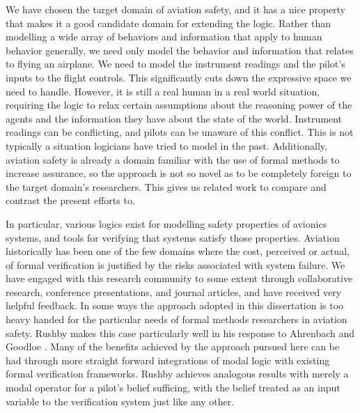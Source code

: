 We have chosen the target domain of aviation safety, and it has a nice property that makes it a good candidate domain for extending the logic. Rather than modelling a wide array of behaviors and information that apply to human behavior generally, we need only model the behavior and information that relates to flying an airplane. We need to model the instrument readings and the pilot's inputs to the flight controls. This significantly cuts down the expressive space we need to handle. However, it is still a real human in a real world situation, requiring the logic to relax certain assumptions about the reasoning power of the agents and the information they have about the state of the world. Instrument readings can be conflicting, and pilots can be unaware of this conflict. This is not typically a situation logicians have tried to model in the past. Additionally, aviation safety is already a domain familiar with the use of formal methods to increase assurance, so the approach is not so novel as to be completely foreign to the target domain's researchers. This gives us related work to compare and contrast the present efforts to.

In particular, various logics exist for modelling safety properties of avionics systems, and tools for verifying that systems satisfy those properties. Aviation historically has been one of the few domains where the cost, perceived or actual, of formal verification is justified by the risks associated with system failure. We have engaged with this research community to some extent through collaborative research, conference presentations, and journal articles, and have received very helpful feedback. In some ways the approach adopted in this dissertation is too heavy handed for the particular needs of formal methods researchers in aviation safety. Rushby makes this case particularly well in his response to Ahrenbach and Goodloe \cite{AhrenbachGoodloe}. Many of the benefits achieved by the approach pursued here can be had through more straight forward integrations of modal logic with existing formal verification frameworks. Rushby achieves analogous results with merely a modal operator for a pilot's belief sufficing, with the belief treated as an input variable to the verification system just like any other.

